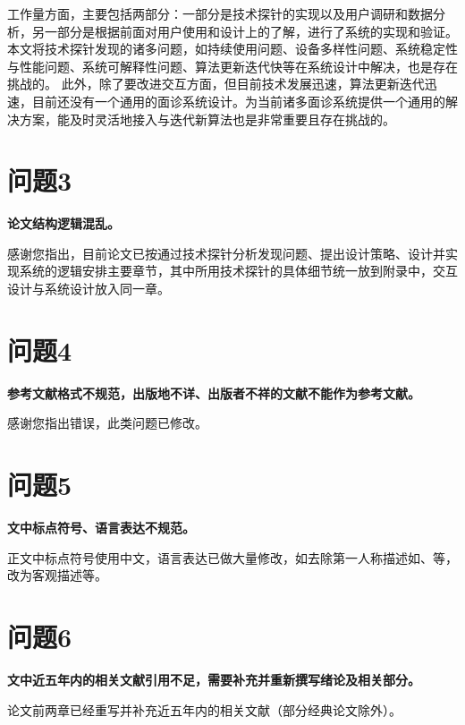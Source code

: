 工作量方面，主要包括两部分：一部分是技术探针的实现以及用户调研和数据分析，另一部分是根据前面对用户使用和设计上的了解，进行了系统的实现和验证。
本文将技术探针发现的诸多问题，如持续使用问题、设备多样性问题、系统稳定性与性能问题、系统可解释性问题、算法更新迭代快等在系统设计中解决，也是存在挑战的。
此外，除了要改进交互方面，但目前技术发展迅速，算法更新迭代迅速，目前还没有一个通用的面诊系统设计。为当前诸多面诊系统提供一个通用的解决方案，能及时灵活地接入与迭代新算法也是非常重要且存在挑战的。


\section{问题3}

\textbf{论文结构逻辑混乱。}

感谢您指出，目前论文已按通过技术探针分析发现问题、提出设计策略、设计并实现系统的逻辑安排主要章节，其中所用技术探针的具体细节统一放到附录中，交互设计与系统设计放入同一章。

\section{问题4}
\textbf{参考文献格式不规范，出版地不详、出版者不祥的文献不能作为参考文献。}

感谢您指出错误，此类问题已修改。

\section{问题5}
\textbf{文中标点符号、语言表达不规范。}

正文中标点符号使用中文，语言表达已做大量修改，如去除第一人称描述如、等，改为客观描述等。

\section{问题6}
\textbf{文中近五年内的相关文献引用不足，需要补充并重新撰写绪论及相关部分。}

论文前两章已经重写并补充近五年内的相关文献（部分经典论文除外）。




